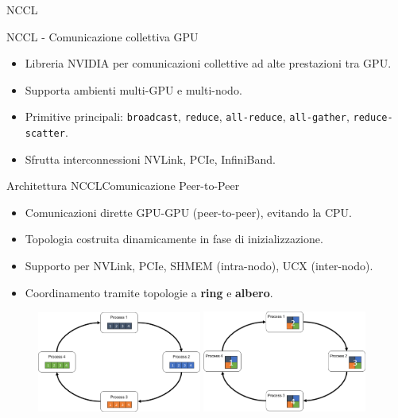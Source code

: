 \begin{frame}
    \centering \Huge
    NCCL
\end{frame}

\begin{frame}{NCCL - Comunicazione collettiva GPU}
    \begin{itemize}
        \item Libreria NVIDIA per comunicazioni collettive ad alte prestazioni tra GPU.
        \item Supporta ambienti multi-GPU e multi-nodo.
        \item Primitive principali: \texttt{broadcast}, \texttt{reduce}, \texttt{all-reduce}, \texttt{all-gather}, \texttt{reduce-scatter}.
        \item Sfrutta interconnessioni NVLink, PCIe, InfiniBand.
    \end{itemize}
\end{frame}

\begin{frame}{Architettura NCCL}{Comunicazione Peer-to-Peer}
    \begin{itemize}
        \item Comunicazioni dirette GPU-GPU (peer-to-peer), evitando la CPU.
        \item Topologia costruita dinamicamente in fase di inizializzazione.
        \item Supporto per NVLink, PCIe, SHMEM (intra-nodo), UCX (inter-nodo).
        \item Coordinamento tramite topologie a \textbf{ring} e \textbf{albero}.
    \end{itemize}

    \begin{figure}
        \centering
        \includegraphics[width=0.48\textwidth]{imgs/nccl_topology_ring_tree.png}%
        \hfill
        \includegraphics[width=0.48\textwidth]{imgs/nccl_topology_ring_tree_2.png}
        \label{fig:ring-tree}
    \end{figure}
\end{frame}

